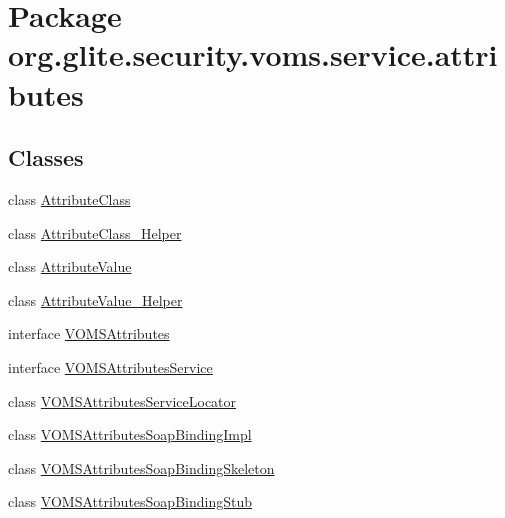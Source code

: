 \hypertarget{namespaceorg_1_1glite_1_1security_1_1voms_1_1service_1_1attributes}{
\section{Package org.glite.security.voms.service.attributes}
\label{namespaceorg_1_1glite_1_1security_1_1voms_1_1service_1_1attributes}
}
\subsection*{Classes}
\begin{DoxyCompactItemize}
\item 
class \hyperlink{classorg_1_1glite_1_1security_1_1voms_1_1service_1_1attributes_1_1AttributeClass}{AttributeClass}
\item 
class \hyperlink{classorg_1_1glite_1_1security_1_1voms_1_1service_1_1attributes_1_1AttributeClass__Helper}{AttributeClass\_\-Helper}
\item 
class \hyperlink{classorg_1_1glite_1_1security_1_1voms_1_1service_1_1attributes_1_1AttributeValue}{AttributeValue}
\item 
class \hyperlink{classorg_1_1glite_1_1security_1_1voms_1_1service_1_1attributes_1_1AttributeValue__Helper}{AttributeValue\_\-Helper}
\item 
interface \hyperlink{interfaceorg_1_1glite_1_1security_1_1voms_1_1service_1_1attributes_1_1VOMSAttributes}{VOMSAttributes}
\item 
interface \hyperlink{interfaceorg_1_1glite_1_1security_1_1voms_1_1service_1_1attributes_1_1VOMSAttributesService}{VOMSAttributesService}
\item 
class \hyperlink{classorg_1_1glite_1_1security_1_1voms_1_1service_1_1attributes_1_1VOMSAttributesServiceLocator}{VOMSAttributesServiceLocator}
\item 
class \hyperlink{classorg_1_1glite_1_1security_1_1voms_1_1service_1_1attributes_1_1VOMSAttributesSoapBindingImpl}{VOMSAttributesSoapBindingImpl}
\item 
class \hyperlink{classorg_1_1glite_1_1security_1_1voms_1_1service_1_1attributes_1_1VOMSAttributesSoapBindingSkeleton}{VOMSAttributesSoapBindingSkeleton}
\item 
class \hyperlink{classorg_1_1glite_1_1security_1_1voms_1_1service_1_1attributes_1_1VOMSAttributesSoapBindingStub}{VOMSAttributesSoapBindingStub}
\end{DoxyCompactItemize}


